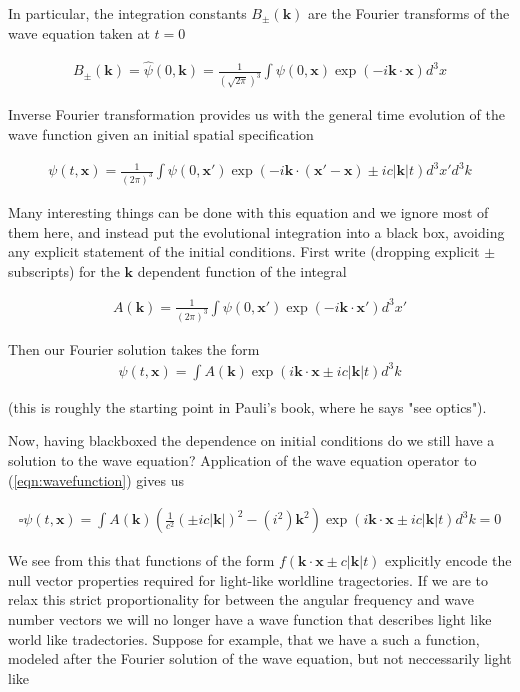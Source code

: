 \documentclass[]{eliblog}
\newcommand{\Abs}[1]{{\left\lvert{#1}\right\rvert}}
\newcommand{\Bk}[0]{\mathbf{k}}
\newcommand{\Bx}[0]{\mathbf{x}}
\newcommand{\delambertian}[0]{\square}
\newcommand{\inv}[1]{\frac{1}{#1}}
\begin{document}
In particular, the integration constants $B_{\pm}(\Bk)$ are the Fourier transforms of the wave equation taken at $t=0$

\begin{align}
B_{\pm}(\Bk) = \hat{\psi}(0,\Bk) = \inv{(\sqrt{2\pi})^3} \int \psi(0,\Bx) \exp\left( -i \Bk \cdot \Bx \right) d^3 x 
\end{align}

Inverse Fourier transformation provides us with the general time evolution of the wave function given an initial spatial specification

\begin{align}
{\psi}(t,\Bx) 
= \inv{({2\pi})^3} \int \psi(0,\Bx') \exp\left( -i \Bk \cdot (\Bx' -\Bx) \pm i c \Abs{\Bk} t \right) d^3 x' d^3 k
\end{align}

Many interesting things can be done with this equation and we ignore most of them here, and instead put the evolutional integration into a black box, avoiding any explicit statement of the initial conditions.  First write (dropping explicit $\pm$ subscripts) for the $\Bk$ dependent function of the integral

\begin{align}
A(\Bk) = \inv{({2\pi})^3} \int \psi(0,\Bx') \exp\left( -i \Bk \cdot \Bx' \right) d^3 x'
\end{align}

Then our Fourier solution takes the form
\begin{align}\label{eqn:wavefunction}
{\psi}(t,\Bx) = \int A(\Bk) \exp\left( i \Bk \cdot \Bx \pm i c \Abs{\Bk} t \right) d^3 k
\end{align}

(this is roughly the starting point in Pauli's book, where he says "see optics").

Now, having blackboxed the dependence on initial conditions do we still have a solution to the wave equation?  Application of the wave equation operator to 
(\ref{eqn:wavefunction}) gives us

\begin{align}
\delambertian {\psi}(t,\Bx) = 
\int A(\Bk) \left( \inv{c^2} (\pm i c \Abs{\Bk})^2 -(i^2)\Bk^2 \right)\exp\left( i \Bk \cdot \Bx \pm i c \Abs{\Bk} t \right) d^3 k = 0
\end{align}

We see from this that functions of the form $f(\Bk \cdot \Bx \pm c \Abs{\Bk} t)$ explicitly encode the null vector properties
required for light-like worldline tragectories.  If we are to relax this strict proportionality for between the angular 
frequency and wave number vectors we will no longer have a wave function that describes light like world like tradectories.
Suppose for example, that we have a such a function, modeled after the Fourier solution of the wave equation, but not
neccessarily light like
\end{document}
